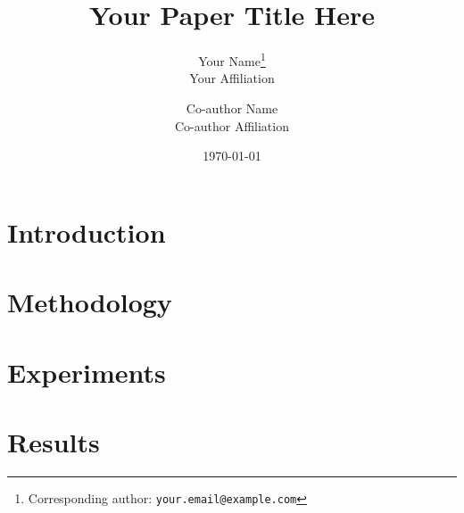 \documentclass[11pt]{article}
\title{Your Paper Title Here}
\author{
  Your Name\thanks{Corresponding author: \texttt{your.email@example.com}} \\
  \normalsize Your Affiliation \\
  \and
  Co-author Name \\
  \normalsize Co-author Affiliation \\
}
\date{\today}
\begin{document}
\maketitle

\begin{abstract}
\end{abstract}



\section{Introduction}

\section{Methodology}

\section{Experiments}

\section{Results}

\end{document}
